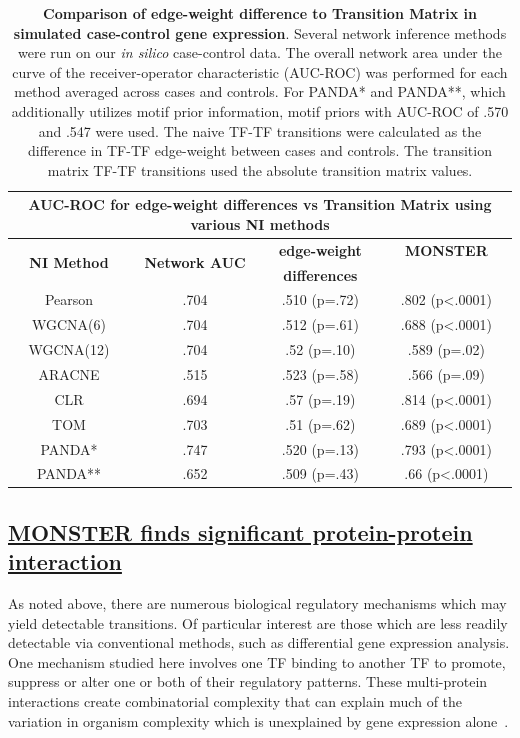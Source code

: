 \documentclass[english]{article}
\providecommand{\tabularnewline}{\\}
\begin{document}
{\tiny

\begin{table}
\begin{tabular}{|cc||c|c|}
\multicolumn{4}{c}{AUC-ROC for edge-weight differences vs Transition Matrix using various
NI methods}\tabularnewline
\hline 
\multirow{2}{*}{\textbf{NI Method}} & \multirow{2}{*}{\textbf{Network AUC}} & \textbf{edge-weight } & \textbf{MONSTER}\tabularnewline
 &  & \textbf{differences} & \tabularnewline
\hline 
Pearson & .704 & .510 (p=.72) & .802 (p<.0001)\tabularnewline
\hline 
WGCNA(6) & .704 & .512 (p=.61) & .688 (p<.0001)\tabularnewline
\hline 
WGCNA(12) & .704 & .52 (p=.10) & .589 (p=.02)\tabularnewline
\hline 
ARACNE & .515 & .523 (p=.58) & .566 (p=.09)\tabularnewline
\hline 
CLR & .694 & .57 (p=.19) & .814 (p<.0001)\tabularnewline
\hline 
TOM & .703 & .51 (p=.62) & .689 (p<.0001)\tabularnewline
\hline 
PANDA{*} & .747 & .520 (p=.13) & .793 (p<.0001)\tabularnewline
\hline 
PANDA{*}{*} & .652 & .509 (p=.43)  & .66 (p<.0001) \tabularnewline
\hline 
\end{tabular}\caption{\textbf{Comparison of edge-weight difference to Transition Matrix
in simulated case-control gene expression}. Several network inference
methods were run on our \emph{in silico} case-control data. The overall
network area under the curve of the receiver-operator characteristic
(AUC-ROC) was performed for each method averaged across cases and
controls. For PANDA{*} and PANDA{*}{*}, which additionally utilizes
motif prior information, motif priors with AUC-ROC of .570 and .547
were used. The naive TF-TF transitions were calculated as the difference
in TF-TF edge-weight between cases and controls. The transition matrix
TF-TF transitions used the absolute transition matrix values. }
\end{table}


}


\subsection*{\uline{MONSTER finds significant protein-protein interaction}}

As noted above, there are numerous biological regulatory mechanisms
which may yield detectable transitions. Of particular interest are
those which are less readily detectable via conventional methods,
such as differential gene expression analysis. One mechanism studied
here involves one TF binding to another TF to promote, suppress or
alter one or both of their regulatory patterns. These multi-protein
interactions create combinatorial complexity that can explain much
of the variation in organism complexity which is unexplained by gene
expression alone~\cite{levine2003transcription}.
\end{document}
